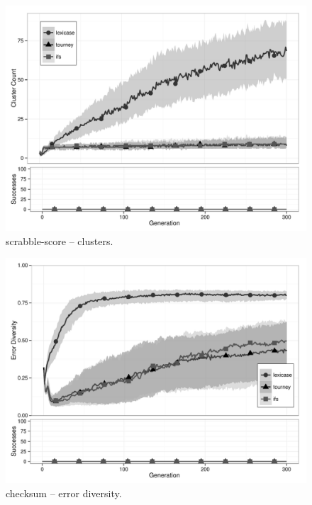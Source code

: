 \begin{figure}%
\centering
\includegraphics[width=11.5cm]{scrabble-score-cluster.pdf}
\caption{scrabble-score -- clusters.}
\label{scrabble-scoreClu}
\end{figure}

\begin{figure}%
\centering
\includegraphics[width=11.5cm]{checksum-diversity.pdf}
\caption{checksum -- error diversity.}
\label{checksumDiv}
\end{figure}

